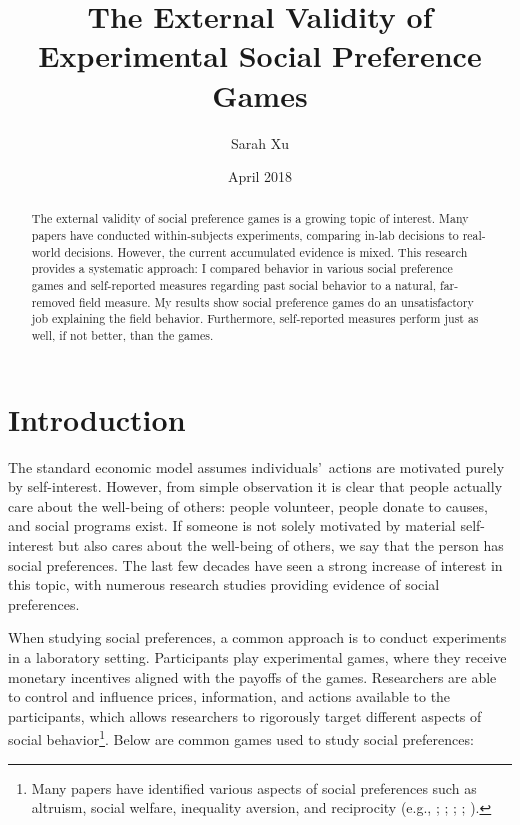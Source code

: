 \documentclass[12pt]{article}
\title{The External Validity of Experimental Social Preference Games}
\author{Sarah Xu}
\date{April 2018}
\begin{document}
\maketitle


\begin{abstract}

The external validity of social preference games is a growing topic of interest. Many papers have conducted within-subjects experiments, comparing in-lab decisions to real-world decisions. However, the current accumulated evidence is mixed. This research provides a systematic approach: I compared behavior in various social preference games and self-reported measures regarding past social behavior to a natural, far-removed field measure. My results show social preference games do an unsatisfactory job explaining the field behavior. Furthermore, self-reported measures perform just as well, if not better, than the games.

\end{abstract}

\section{Introduction}

The standard economic model assumes individuals\rq \ actions are motivated purely by self-interest. However, from simple observation it is clear that people actually care about the well-being of others: people volunteer, people donate to causes, and social programs exist. If someone is not solely motivated by material self-interest but also cares about the well-being of others, we say that the person has social preferences. The last few decades have seen a strong increase of interest in this topic, with numerous research studies providing evidence of social preferences. %
 
When studying social preferences, a common approach is to conduct experiments in a laboratory setting. Participants play experimental games, where they receive monetary incentives aligned with the payoffs of the games. Researchers are able to control and influence prices, information, and actions available to the participants, which allows researchers to rigorously target different aspects of social behavior\footnote{Many papers have identified various aspects of social preferences such as altruism, social welfare, inequality aversion, and reciprocity (e.g., \cite{charness_rabin_2002}; \cite{fehr_schmidt_1999}; \cite{andreoni_miller_2002}; \cite{rabin_1993}; \cite{fisman_jakiela_kariv_2014}).}. Below are common games used to study social preferences: 
\end{document}
